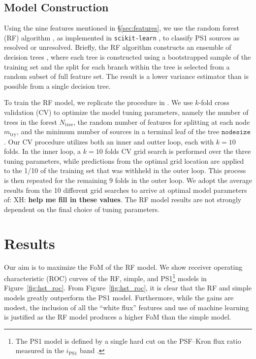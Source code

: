 \documentclass[twocolumn]{aastex63}
\newcommand{\xander}[1]{{\color{red} XH: \textbf{#1}}}
\begin{document}
\subsection{Model Construction}

Using the nine features mentioned in \S\ref{sec:features}, we use the random
forest (RF) algorithm \citep{Breiman01}, as implemented in
\texttt{scikit-learn} \citep{Pedregosa11}, to classify PS1 sources as resolved
or unresolved. Briefly, the RF algorithm constructs an ensemble of decision
trees \citep{Breiman84}, where each tree is constructed using a bootstrapped
sample of the training set \citep[a method known as ``bagging'';][]{Breiman96}
and the split for each branch within the tree is selected from a random subset
of full feature set. The result is a lower variance estimator than is possible
from a single decision tree.

To train the RF model, we replicate the procedure in \citet{Tachibana18}. We
use $k$-fold cross validation (CV) to optimize the model tuning parameters,
namely the number of trees in the forest $N_\mathrm{tree}$, the random number
of features for splitting at each node $m_\mathrm{try}$, and the minimum
number of sources in a terminal leaf of the tree $\mathtt{nodesize}$. Our CV
procedure utilizes both an inner and outter loop, each with $k = 10$ folds. In
the inner loop, a $k = 10$ folds CV grid search is performed over the three
tuning parameters, while predictions from the optimal grid location are
applied to the 1/10 of the training set that was withheld in the outer loop.
This process is then repeated for the remaining 9 folds in the outer loop. We
adopt the average results from the 10 different grid searches to arrive at
optimal model parameters of: \xander{help me fill in these values}. The RF
model results are not strongly dependent on the final choice of tuning
parameters.

\section{Results}

Our aim is to maximize the FoM of the RF model. We show receiver operating characteristic (ROC) curves of the RF,
simple, and PS1\footnote{The PS1 model is defined by a single hard cut on the
PSF--Kron flux ratio measured in the $i_\mathrm{PS1}$ band \citep[for further
details see][]{Tachibana18}.} models in Figure~\ref{fig:hst_roc}. From
Figure~\ref{fig:hst_roc}, it is clear that the RF and simple models greatly
outperform the PS1 model. Furthermore, while the gains are modest, the
inclusion of all the ``white flux'' features and use of machine learning is
justified as the RF model produces a higher FoM than the simple model.
\end{document}
